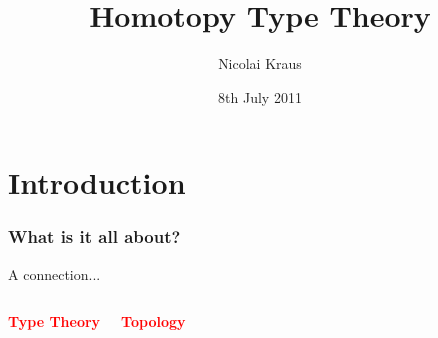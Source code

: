 \documentclass[12pt,pdflatex,hyperref={pdfstartview=Fit,bookmarks=true,bookmarksopen=true,pdfpagemode=None,colorlinks=true,linkcolor=unserblau,urlcolor=unserblau},notes=hide,t,handout]{beamer}
\author[Nicolai Kraus]{Nicolai Kraus}
\institute{Functional Programming Laboratory Away Day}
\date[2011-06-8]{8th July 2011}
\title{Homotopy Type Theory}
\subtitle[FP Away Day 2011]{}
\begin{document}
\frame{\titlepage}




\section{Introduction}

\begin{frame}

\frametitle{What is it all about?}
\begin{center}{A connection...}\end{center}
\begin{columns}[u] %


\vspace{3pt}

\begin{block}{} \Large \begin{center}
\textcolor{red}{\bf Type Theory}
\end{center}
\end{block}


\vspace{3pt}
\begin{block}{} \Large \begin{center}
\textcolor{red}{\bf Topology}
\end{center}
\end{block}

\end{columns}


\end{frame}
\end{document}

